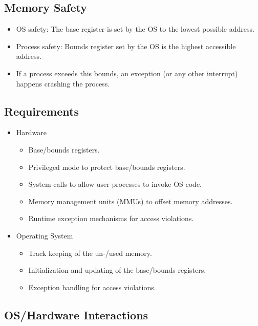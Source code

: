 \documentclass[a4paper, 11pt, accentcolor = tud3b]{tudreport}
\begin{document}
            \subsection{Memory Safety}
                \begin{itemize}
                	\item OS safety: The base register is set by the OS to the lowest possible address.
                	\item Process safety: Bounds register set by the OS is the highest accessible address.
                	\item If a process exceeds this bounds, an exception (or any other interrupt) happens crashing the process.
                \end{itemize}

            \subsection{Requirements}
                \begin{itemize}
                	\item Hardware
	                	\begin{itemize}
	                		\item Base/bounds registers.
	                		\item Privileged mode to protect base/bounds registers.
	                		\item System calls to allow user processes to invoke OS code.
	                		\item Memory management units (MMUs) to offset memory addresses.
	                		\item Runtime exception mechanisms for access violations.
	                	\end{itemize}
                	\item Operating System
	                	\begin{itemize}
	                		\item Track keeping of the un-/used memory.
	                		\item Initialization and updating of the base/bounds registers.
	                		\item Exception handling for access violations.
	                	\end{itemize}
                \end{itemize}

            \subsection{OS/Hardware Interactions}
\end{document}
